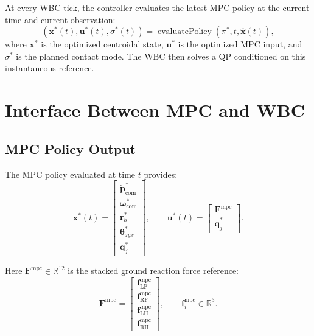\documentclass[11pt,a4paper]{article}
\newcommand{\R}{\mathbb{R}}
\begin{document}
At every WBC tick, the controller evaluates the latest MPC policy at the current time and current observation:
\begin{equation}
	(\bm{x}^*(t),\bm{u}^*(t),\sigma^*(t))
	=
	\operatorname{evaluatePolicy}\!\left(\pi^*,t,\hat{\bm{x}}(t)\right),
\end{equation}
where $\bm{x}^*$ is the optimized centroidal state, $\bm{u}^*$ is the optimized MPC input, and $\sigma^*$ is the planned contact mode. The WBC then solves a QP conditioned on this instantaneous reference.


\section{Interface Between MPC and WBC}

\subsection{MPC Policy Output}

The MPC policy evaluated at time $t$ provides:
\begin{equation}
	\bm{x}^*(t)
	=
	\begin{bmatrix}
		\dot{\bm{p}}_{\text{com}}^* \\
		\bm{\omega}_{\text{com}}^* \\
		\bm{r}_b^* \\
		\bm{\theta}_{zyx}^* \\
		\bm{q}_j^*
	\end{bmatrix},
	\qquad
	\bm{u}^*(t)
	=
	\begin{bmatrix}
		\bm{F}^{\text{mpc}} \\
		\dot{\bm{q}}_j^*
	\end{bmatrix}.
\end{equation}

Here $\bm{F}^{\text{mpc}} \in \R^{12}$ is the stacked ground reaction force reference:
\begin{equation}
	\bm{F}^{\text{mpc}}
	=
	\begin{bmatrix}
		\bm{f}_{\text{LF}}^{\text{mpc}} \\
		\bm{f}_{\text{RF}}^{\text{mpc}} \\
		\bm{f}_{\text{LH}}^{\text{mpc}} \\
		\bm{f}_{\text{RH}}^{\text{mpc}}
	\end{bmatrix},
	\qquad
	\bm{f}_i^{\text{mpc}} \in \R^3.
\end{equation}
\end{document}
